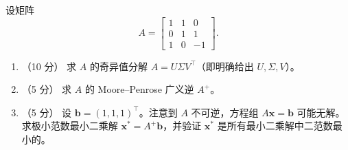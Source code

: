 \documentclass[10pt,a4paper]{exam-zh}
\newcommand{\bvec}[1]{\boldsymbol{#1}}
\begin{document}
\begin{problem}[points = 20]
设矩阵
\[
A = \begin{bmatrix}
1 & 1 & 0 \\
0 & 1 & 1 \\
1 & 0 & -1
\end{bmatrix}.
\]

\begin{enumerate}
    \item （10 分） 求 $A$ 的奇异值分解 $A = U \Sigma V^\top$（即明确给出 $U, \Sigma, V$）。

    \item （5 分） 求 $A$ 的 Moore--Penrose 广义逆 $A^+$。

    \item （5 分） 设 $\bvec{b} = (1, 1, 1)^\top$。注意到 $A$ 不可逆，方程组 $A\bvec{x} = \bvec{b}$ 可能无解。求极小范数最小二乘解 $\bvec{x}^* = A^+ \bvec{b}$，并验证 $\bvec{x}^*$ 是所有最小二乘解中二范数最小的。
\end{enumerate}
\end{problem}
\end{document}

